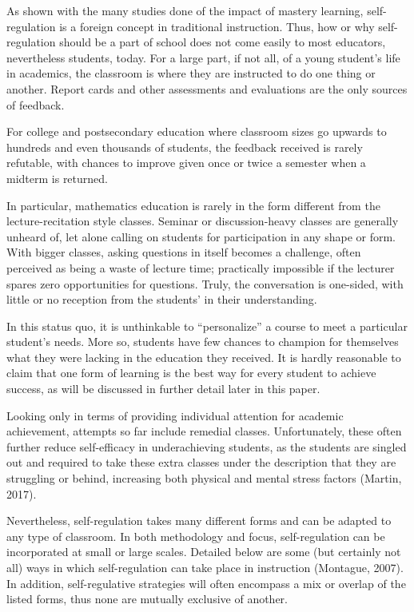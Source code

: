 As shown with the many studies done of the impact of mastery learning, self-regulation is a foreign concept in traditional instruction. Thus, how or why self-regulation should be a part of school does not come easily to most educators, nevertheless students, today. For a large part, if not all, of a young student's life in academics, the classroom is where they are instructed to do one thing or another. Report cards and other assessments and evaluations are the only sources of feedback.

For college and postsecondary education where classroom sizes go upwards to hundreds and even thousands of students, the feedback received is rarely refutable, with chances to improve given once or twice a semester when a midterm is returned.

In particular, mathematics education is rarely in the form different from the lecture-recitation style classes. Seminar or discussion-heavy classes are generally unheard of, let alone calling on students for participation in any shape or form. With bigger classes, asking questions in itself becomes a challenge, often perceived as being a waste of lecture time; practically impossible if the lecturer spares zero opportunities for questions. Truly, the conversation is one-sided, with little or no reception from the students' in their understanding.

In this status quo, it is unthinkable to ``personalize'' a course to meet a particular student's needs. More so, students have few chances to champion for themselves what they were lacking in the education they received. It is hardly reasonable to claim that one form of learning is the best way for every student to achieve success, as will be discussed in further detail later in this paper.

Looking only in terms of providing individual attention for academic achievement, attempts so far include remedial classes. Unfortunately, these often further reduce self-efficacy in underachieving students, as the students are singled out and required to take these extra classes under the description that they are struggling or behind, increasing both physical and mental stress factors (Martin, 2017).

Nevertheless, self-regulation takes many different forms and can be adapted to any type of classroom. In both methodology and focus, self-regulation can be incorporated at small or large scales. Detailed below are some (but certainly not all) ways in which self-regulation can take place in instruction (Montague, 2007). In addition, self-regulative strategies will often encompass a mix or overlap of the listed forms, thus none are mutually exclusive of another.

